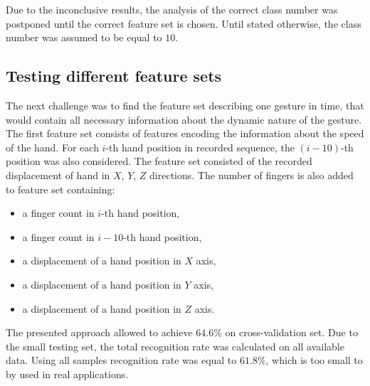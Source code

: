Due to the inconclusive results, the analysis of the correct class number was postponed until the correct feature set is chosen.
Until stated otherwise, the class number was assumed to be equal to $10$.

\subsection{Testing different feature sets}
The next challenge was to find the feature set describing one gesture in time, that would contain all necessary information about the dynamic nature of the gesture. 
The first feature set consists of features encoding the information about the speed of the hand. For each $i$-th hand position in recorded sequence, the $(i-10)$-th position was also considered. 
The feature set consisted of the recorded displacement of hand in $X$, $Y$, $Z$ directions.
The number of fingers is also added to feature set containing:
\begin{itemize}
\item a finger count in $i$-th hand position,
\item a finger count in $i-10$-th hand position,
\item a displacement of a hand position in $X$ axis,
\item a displacement of a hand position in $Y$ axis,
\item a displacement of a hand position in $Z$ axis.
\end{itemize}
The presented approach allowed to achieve $64.6\%$ on cross-validation set. 
Due to the small testing set, the total recognition rate was calculated on all available data.
Using all samples recognition rate was equal to $61.8\%$, which is too small to by used in real applications.

